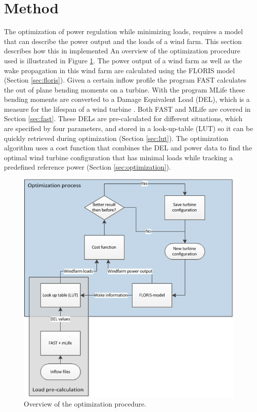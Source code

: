 \section{Method} \label{sec:method}
	The optimization of power regulation while minimizing loads, requires a model that can describe the power output and the loads of a wind farm. This section describes how this in implemented \newline
	An overview of the optimization procedure used is illustrated in Figure \ref{fig:optim}.
	The power output of a wind farm as well as the wake propagation in this wind farm are calculated using the FLORIS model \cite{FLORIS} (Section \ref{sec:floris}). Given a certain inflow profile the program FAST calculates the out of plane bending moments on a turbine. With the program MLife these bending moments are converted to a Damage Equivalent Load (DEL), which is a measure for the lifespan of a wind turbine \cite{MLife}. Both FAST and MLife are covered in Section \ref{sec:fast}. These DELs are pre-calculated for different situations, which are specified by four parameters, and stored in a look-up-table (LUT) so it can be quickly retrieved during optimization (Section \ref{sec:lut}). The optimization algorithm uses a cost function that combines the DEL and power data to find the optimal wind turbine configuration that has minimal loads while tracking a predefined reference power (Section \ref{sec:optimization}).

	\begin{figure}
		\includegraphics[width=\linewidth]{./Figures/OptimizationProcess.png}
		\caption{Overview of the optimization procedure.}
		\label{fig:optim}
	\end{figure}


